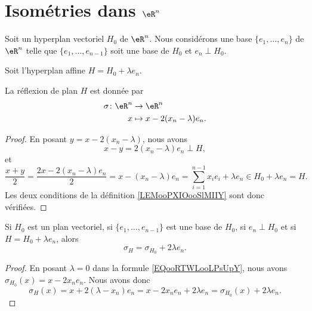 \section{Isométries dans \( \eR^n\)}

\begin{lemma}
	Soit un hyperplan vectoriel \( H_0\) de \( \eR^n\). Nous considérons une base \( \{ e_1,\ldots,e_n \}\) de \( \eR^n\) telle que \( \{ e_1,\ldots,e_{n-1} \}\) soit une base de \( H_0\) et \( e_n\perp  H_0\).

	Soit l'hyperplan affine \( H=H_0+\lambda e_n\).

	La réflexion de plan \( H \) est donnée par
	\begin{equation} \label{EQooRTWLooLPsUpY}
		\begin{aligned}
			\sigma\colon \eR^n & \to \eR^n                    \\
			x                  & \mapsto x-2(x_n-\lambda)e_n.
		\end{aligned}
	\end{equation}
\end{lemma}


\begin{proof}
	En posant \( y=x-2(x_n-\lambda)\), nous avons
	\begin{equation}
		x-y=2(x_n-\lambda)e_n\perp H,
	\end{equation}
	et
	\begin{equation}
		\frac{ x+y }{ 2 }=\frac{ 2x-2(x_n-\lambda)e_n }{ 2 }=x-(x_n-\lambda)e_n=\sum_{i=1}^{n-1}x_ie_i+\lambda e_n\in H_0+\lambda e_n=H.
	\end{equation}
	Les deux conditions de la définition \ref{LEMooPXIOooSlMIIY} sont donc vérifiées.
\end{proof}


\begin{lemma}       \label{LEMooWYVRooQmWqvM}
	Si \( H_0\) est un plan vectoriel, si \( \{ e_1,\ldots,e_{n-1} \}\) est une base de \( H_0\), si \( e_n\perp H_0\) et si \( H=H_0+\lambda e_n\), alors
	\begin{equation}
		\sigma_H=\sigma_{H_0}+2\lambda e_n.
	\end{equation}
\end{lemma}

\begin{proof}
	En posant \( \lambda=0\) dans la formule \eqref{EQooRTWLooLPsUpY}, nous avons \( \sigma_{H_0}(x)=x-2x_ne_n\). Nous avons donc
	\begin{equation}
		\sigma_H(x)=x+2(\lambda-x_n)e_n=x-2x_ne_n+2\lambda e_n=\sigma_{H_0}(x)+2\lambda e_n.
	\end{equation}
\end{proof}


